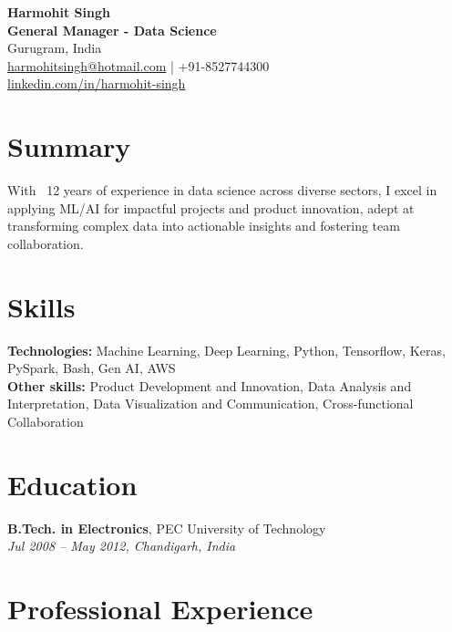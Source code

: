 \documentclass[a4paper,10pt]{article}
\begin{document}
\begin{center}
    \textbf{\LARGE Harmohit Singh} \\
    \vspace{0.2em}
    \textbf{General Manager - Data Science} \\
    Gurugram, India \\
    \href{mailto:harmohitsingh@hotmail.com}{harmohitsingh@hotmail.com} \quad | \quad +91-8527744300 \\
    \href{https://linkedin.com/in/harmohit-singh}{linkedin.com/in/harmohit-singh}
\end{center}

\vspace{1em}

\section*{Summary}
With ~12 years of experience in data science across diverse sectors, I excel in applying ML/AI for impactful projects and product innovation, adept at transforming complex data into actionable insights and fostering team collaboration.

\section*{Skills}
\textbf{Technologies:} Machine Learning, Deep Learning, Python, Tensorflow, Keras, PySpark, Bash, Gen AI, AWS \\
\textbf{Other skills:} Product Development and Innovation, Data Analysis and Interpretation, Data Visualization and Communication, Cross-functional Collaboration

\section*{Education}
\textbf{B.Tech. in Electronics}, PEC University of Technology \\
\textit{Jul 2008 – May 2012, Chandigarh, India}

\section*{Professional Experience}
\end{document}

